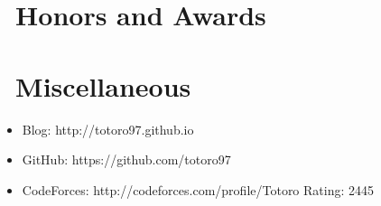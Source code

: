 \documentclass{resume}
\begin{document}
\section{\faHeartO\ Honors and Awards}

\section{\faInfo\ Miscellaneous}
\begin{itemize}[parsep=0.5ex]
  \item Blog: http://totoro97.github.io
  \item GitHub: https://github.com/totoro97
  \item CodeForces: http://codeforces.com/profile/Totoro Rating: 2445
\end{itemize}

%
%
\end{document}
